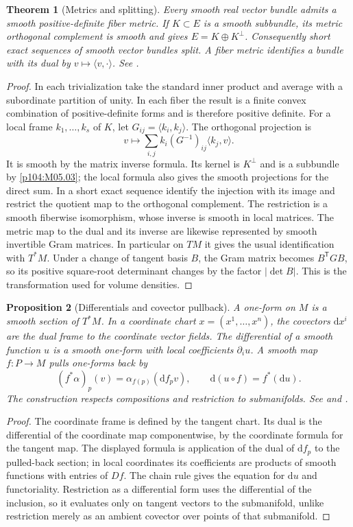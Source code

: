 \documentclass[11pt,oneside,openany]{book}
\newtheorem{theorem}{Theorem}[chapter]
\newtheorem{proposition}[theorem]{Proposition}
\theoremstyle{definition}
\theoremstyle{remark}
\newcommand{\dd}{\mathrm d}
\begin{document}
\begin{theorem}[Metrics and splitting]\label{p104:M05.05}
Every smooth real vector bundle admits a smooth positive-definite fiber metric. If \(K\subset E\) is a smooth subbundle, its metric orthogonal complement is smooth and gives \(E=K\oplus K^\perp\). Consequently short exact sequences of smooth vector bundles split. A fiber metric identifies a bundle with its dual by \(v\mapsto \langle v,\cdot\rangle\). See \cite[Chapter 13]{lee}.
\end{theorem}
\begin{proof}
In each trivialization take the standard inner product and average with a subordinate partition of unity. In each fiber the result is a finite convex combination of positive-definite forms and is therefore positive definite. For a local frame \(k_1,\ldots,k_s\) of \(K\), let \(G_{ij}=\langle k_i,k_j\rangle\). The orthogonal projection is
\[
 v\longmapsto \sum_{i,j}k_i(G^{-1})_{ij}\langle k_j,v\rangle .
\]
It is smooth by the matrix inverse formula. Its kernel is \(K^\perp\) and is a subbundle by \cref{p104:M05.03}; the local formula also gives the smooth projections for the direct sum. In a short exact sequence identify the injection with its image and restrict the quotient map to the orthogonal complement. The restriction is a smooth fiberwise isomorphism, whose inverse is smooth in local matrices. The metric map to the dual and its inverse are likewise represented by smooth invertible Gram matrices. In particular on \(TM\) it gives the usual identification with \(T^*M\). Under a change of tangent basis \(B\), the Gram matrix becomes \(B^{\mathsf T}GB\), so its positive square-root determinant changes by the factor \(\lvert\det B\rvert\). This is the transformation used for volume densities.
\end{proof}

\begin{proposition}[Differentials and covector pullback]\label{p104:M05.06}
A one-form on \(M\) is a smooth section of \(T^*M\). In a coordinate chart \(x=(x^1,\ldots,x^n)\), the covectors \(\dd x^i\) are the dual frame to the coordinate vector fields. The differential of a smooth function \(u\) is a smooth one-form with local coefficients \(\partial_i u\). A smooth map \(f:P\to M\) pulls one-forms back by
\[
 (f^*\alpha)_p(v)=\alpha_{f(p)}(\dd f_p v),
 \qquad \dd(u\circ f)=f^*(\dd u).
\]
The construction respects compositions and restriction to submanifolds. See \cite[pp.\ 272--287]{lee} and \cite[\S17]{tu}.
\end{proposition}
\begin{proof}
The coordinate frame is defined by the tangent chart. Its dual is the differential of the coordinate map componentwise, by the coordinate formula for the tangent map. The displayed formula is application of the dual of \(\dd f_p\) to the pulled-back section; in local coordinates its coefficients are products of smooth functions with entries of \(Df\). The chain rule gives the equation for \(\dd u\) and functoriality. Restriction as a differential form uses the differential of the inclusion, so it evaluates only on tangent vectors to the submanifold, unlike restriction merely as an ambient covector over points of that submanifold.
\end{proof}
\end{document}
